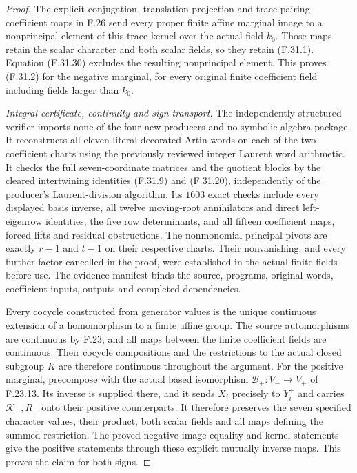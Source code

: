 \begin{proof}
The explicit conjugation, translation
projection and trace-pairing coefficient
maps in F.26 send every proper finite
affine marginal image to a nonprincipal
element of this trace kernel over the
actual field $k_0$.
Those maps retain the scalar character
and both scalar fields, so they retain
(F.31.1). Equation (F.31.30) excludes
the resulting nonprincipal element.
This proves (F.31.2) for the negative
marginal, for every original finite
coefficient field including fields
larger than $k_0$.

\emph{Integral certificate, continuity and sign transport.}
The independently structured verifier
imports none of the four new producers
and no symbolic algebra package.
It reconstructs all eleven literal
decorated Artin words on each of the
two coefficient charts using the
previously reviewed integer Laurent
word arithmetic. It checks the full
seven-coordinate matrices and the
quotient blocks by the cleared
intertwining identities (F.31.9) and
(F.31.20), independently of the
producer's Laurent-division algorithm.
Its $1603$ exact checks include every
displayed basis inverse, all twelve
moving-root annihilators and direct
left-eigenrow identities, the five
row determinants, and all fifteen
coefficient maps, forced lifts and
residual obstructions.
The nonmonomial principal pivots are
exactly $r-1$ and $t-1$ on their
respective charts. Their nonvanishing,
and every further factor cancelled
in the proof, were established in
the actual finite fields before use.
The evidence manifest binds the
source, programs, original words,
coefficient inputs, outputs and
completed dependencies.

Every cocycle constructed from generator
values is the unique continuous extension
of a homomorphism to a finite affine
group. The source automorphisms are
continuous by F.23, and all maps between
the finite coefficient fields are
continuous. Their cocycle compositions
and the restrictions to the actual
closed subgroup $K$ are therefore
continuous throughout the argument.
For the positive marginal, precompose
with the actual based isomorphism
$\mathcal B_+:V_-\to V_+$ of F.23.13.
Its inverse is supplied there, and
it sends $X_i$ precisely to $Y_i^+$
and carries $\mathcal K_-,R_-$ onto
their positive counterparts.
It therefore preserves the seven
specified character values, their
product, both scalar fields and
all maps defining the summed restriction.
The proved negative image equality
and kernel statements give the
positive statements through these
explicit mutually inverse maps.
This proves the claim for both signs.
\end{proof}
